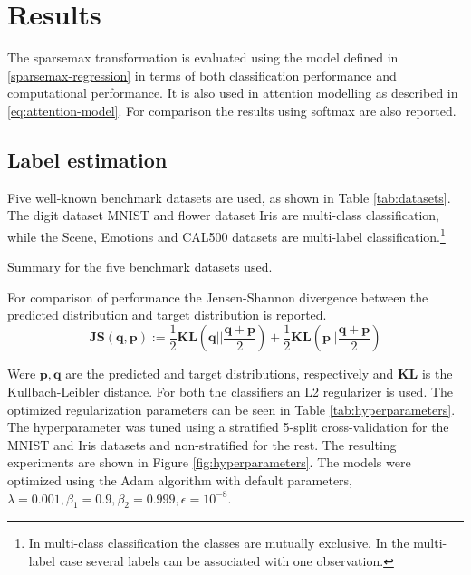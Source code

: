 \section{Results}
The sparsemax transformation is evaluated using the model defined in \eqref{sparsemax-regression} in terms of both classification performance and computational performance. It is also used in attention modelling as described in \eqref{eq:attention-model}. For comparison the results using softmax are also reported.

\subsection{Label estimation}
Five well-known benchmark datasets are used, as shown in Table \ref{tab:datasets}. The digit dataset MNIST and flower dataset Iris are multi-class classification, while the Scene, Emotions and CAL500 datasets are multi-label classification.\footnote{In multi-class classification the classes are mutually exclusive. In the multi-label case several labels can be associated with one observation.} 
\begin{table}[H]
\centering

\caption{Summary for the five benchmark datasets used.}
\label{tab:datasets}
\end{table}
For comparison of performance the Jensen-Shannon divergence between the predicted distribution and target distribution is reported.
\begin{equation*}
\mathbf{JS(q,p)}:=\frac{1}{2}\mathbf{KL}\left(\mathbf{q}\Big|\Big|\frac{\mathbf{q}+\mathbf{p}}{2}\right)+\frac{1}{2}\mathbf{KL}\left(\mathbf{p}\Big|\Big|\frac{\mathbf{q}+\mathbf{p}}{2}\right)
\end{equation*}

Were $\mathbf{p}, \mathbf{q}$ are the predicted and target distributions, respectively and $\mathbf{KL}$ is the Kullbach-Leibler distance. For both the classifiers an L2 regularizer is used. The optimized regularization parameters can be seen in Table \ref{tab:hyperparameters}. The hyperparameter was tuned using a stratified 5-split cross-validation for the MNIST and Iris datasets and non-stratified for the rest. The resulting experiments are shown in Figure \ref{fig:hyperparameters}. The models were optimized using the Adam algorithm with default parameters, $\lambda = 0.001, \beta_1=0.9, \beta_2 = 0.999, \epsilon = 10^{-8}$.

